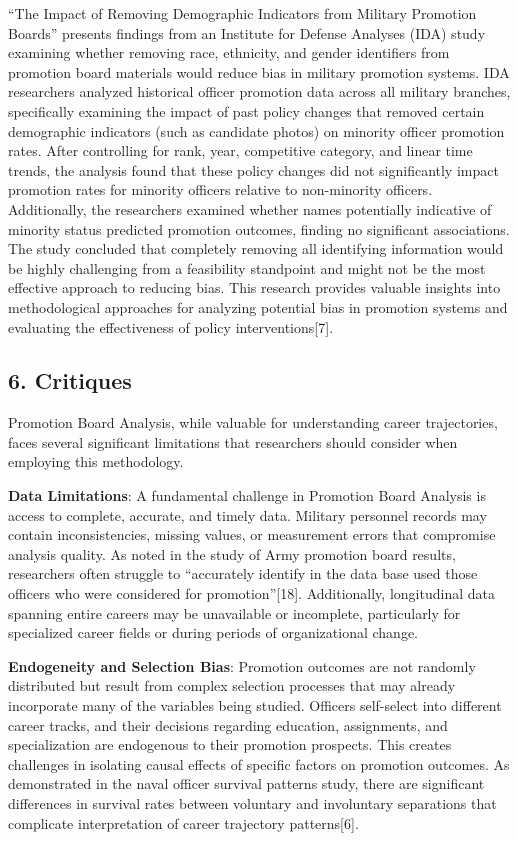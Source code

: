 \documentclass[
  letterpaper,
  DIV=11,
  numbers=noendperiod]{scrartcl}
\begin{document}
``The Impact of Removing Demographic Indicators from Military Promotion
Boards'' presents findings from an Institute for Defense Analyses (IDA)
study examining whether removing race, ethnicity, and gender identifiers
from promotion board materials would reduce bias in military promotion
systems. IDA researchers analyzed historical officer promotion data
across all military branches, specifically examining the impact of past
policy changes that removed certain demographic indicators (such as
candidate photos) on minority officer promotion rates. After controlling
for rank, year, competitive category, and linear time trends, the
analysis found that these policy changes did not significantly impact
promotion rates for minority officers relative to non-minority officers.
Additionally, the researchers examined whether names potentially
indicative of minority status predicted promotion outcomes, finding no
significant associations. The study concluded that completely removing
all identifying information would be highly challenging from a
feasibility standpoint and might not be the most effective approach to
reducing bias. This research provides valuable insights into
methodological approaches for analyzing potential bias in promotion
systems and evaluating the effectiveness of policy interventions{[}7{]}.

\subsection{6. Critiques}\label{critiques}

Promotion Board Analysis, while valuable for understanding career
trajectories, faces several significant limitations that researchers
should consider when employing this methodology.

\textbf{Data Limitations}: A fundamental challenge in Promotion Board
Analysis is access to complete, accurate, and timely data. Military
personnel records may contain inconsistencies, missing values, or
measurement errors that compromise analysis quality. As noted in the
study of Army promotion board results, researchers often struggle to
``accurately identify in the data base used those officers who were
considered for promotion''{[}18{]}. Additionally, longitudinal data
spanning entire careers may be unavailable or incomplete, particularly
for specialized career fields or during periods of organizational
change.

\textbf{Endogeneity and Selection Bias}: Promotion outcomes are not
randomly distributed but result from complex selection processes that
may already incorporate many of the variables being studied. Officers
self-select into different career tracks, and their decisions regarding
education, assignments, and specialization are endogenous to their
promotion prospects. This creates challenges in isolating causal effects
of specific factors on promotion outcomes. As demonstrated in the naval
officer survival patterns study, there are significant differences in
survival rates between voluntary and involuntary separations that
complicate interpretation of career trajectory patterns{[}6{]}.
\end{document}
